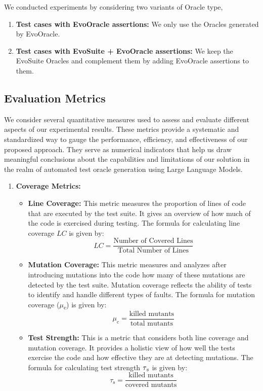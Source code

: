 \noindent
We conducted experiments by considering two variants of Oracle type, 
\begin{enumerate}
    \item \textbf{Test cases with EvoOracle assertions:} We only use the Oracles generated by EvoOracle.
    \item \textbf{Test cases with EvoSuite + EvoOracle assertions:} We keep the EvoSuite Oracles and complement them by adding EvoOracle assertions to them.
\end{enumerate}
\vspace{0.1 cm}
\subsection{Evaluation Metrics}
\label{sec:evaluation_metrics}
\vspace{0.1 cm}
We consider several quantitative measures used to assess and evaluate different aspects of our experimental results. These metrics provide a systematic and standardized way to gauge the performance, efficiency, and effectiveness of our proposed approach. They serve as numerical indicators that help us draw meaningful conclusions about the capabilities and limitations of our solution in the realm of automated test oracle generation using Large Language Models.

    \begin{enumerate}
        \item \textbf{Coverage Metrics:}
        \begin{itemize}
            \item \textbf{Line Coverage:} This metric measures the proportion of lines of code that are executed by the test suite. It gives an overview of how much of the code is exercised during testing. The formula for calculating line coverage \(LC\) is given by:
\[
LC = \frac{\text{{Number of Covered Lines}}}{\text{{Total Number of Lines}}}
\]

            \item \textbf{Mutation Coverage:} This metric measures and analyzes after introducing mutations into the code how many of these mutations are detected by the test suite. Mutation coverage reflects the ability of tests to identify and handle different types of faults.
            The formula for mutation coverage ($\mu$\textsubscript{c}) is given by:
\[
\mu_{\text{c}} = \frac{\text{{killed mutants}}}{\text{{total mutants}}}
\]
            \item \textbf{Test Strength:} This is a metric that considers both line coverage and mutation coverage. It provides a holistic view of how well the tests exercise the code and how effective they are at detecting mutations. The formula for calculating test strength \(\tau\textsubscript{s}\) is given by:
\[
\tau_{\text{s}} = \frac{\text{{killed mutants}}}{\text{{covered mutants}}}
\]
        \end{itemize}
    \end{enumerate}

